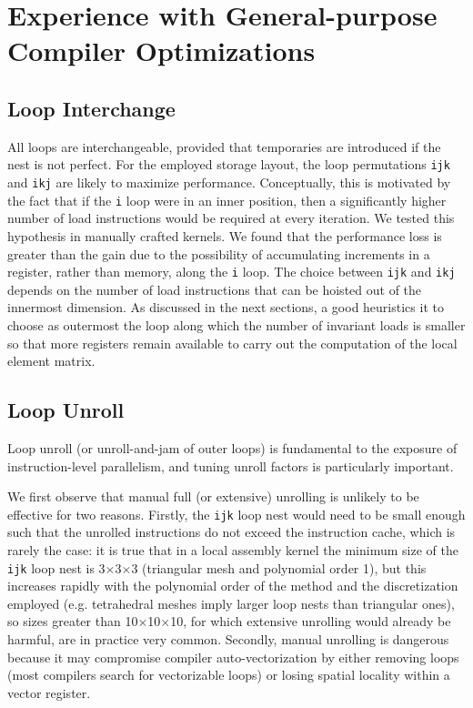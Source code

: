 \section{Experience with General-purpose Compiler Optimizations}
\label{sec:coffee-genpurp-opts}

\subsection{Loop Interchange}
\label{sec:coffee-genpurp-opts-interchange}
All loops are interchangeable, provided that temporaries are introduced if the nest is not perfect. For the employed storage layout, the loop permutations \texttt{ijk} and \texttt{ikj} are likely to maximize performance. Conceptually, this is motivated by the fact that if the \texttt{i} loop were in an inner position, then a significantly higher number of load instructions would be required at every iteration. We tested this hypothesis in manually crafted kernels. We found that the performance loss is greater than the gain due to the possibility of accumulating increments in a register, rather than memory, along the \texttt{i} loop. The choice between \texttt{ijk} and \texttt{ikj} depends on the number of load instructions that can be hoisted out of the innermost dimension. As discussed in the next sections, a good heuristics it to choose as outermost the loop along which the number of invariant loads is smaller so that more registers remain available to carry out the computation of the local element matrix.

\subsection{Loop Unroll}
Loop unroll (or unroll-and-jam of outer loops) is fundamental to the exposure of instruction-level parallelism, and tuning unroll factors is particularly important.

We first observe that manual full (or extensive) unrolling is unlikely to be effective for two reasons. Firstly, the \texttt{ijk} loop nest would need to be small enough such that the unrolled instructions do not exceed the instruction cache, which is rarely the case: it is true that in a local assembly kernel the minimum size of the \texttt{ijk} loop nest is 3$\times$3$\times$3 (triangular mesh and polynomial order 1), but this increases rapidly with the polynomial order of the method and the discretization employed (e.g. tetrahedral meshes imply larger loop nests than triangular ones), so sizes greater than 10$\times$10$\times$10, for which extensive unrolling would already be harmful, are in practice very common. Secondly, manual unrolling is dangerous because it may compromise compiler auto-vectorization by either removing loops (most compilers search for vectorizable loops) or losing spatial locality within a vector register.

